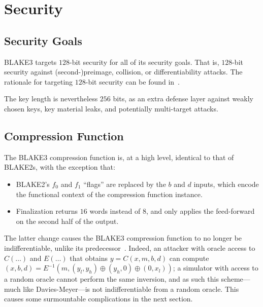 \documentclass[11pt,notitlepage,a4paper]{article}
\begin{document}
\section{Security}\label{sec:security}

\subsection{Security Goals}\label{sec:goals}

BLAKE3 targets $128$-bit security for all of its security goals. That
is, $128$-bit security against (second-)preimage, collision, or
differentiability attacks. 
The rationale for targeting $128$-bit security can be found
in~\cite[\S2]{TMC}.

The key length is nevertheless $256$ bits, as an extra defense layer
against weakly chosen keys, key material leaks, and potentially
multi-target attacks.


\subsection{Compression Function}\label{sec:compressindiff}

The BLAKE3 compression function is, at a high level, identical to that of BLAKE2s, with
the exception that:

\begin{itemize}
  \item BLAKE2's $f_0$ and $f_1$ ``flags'' are replaced by the $b$ and $d$ inputs, which
  encode the functional context of the compression function instance.
  \item Finalization returns $16$ words instead of $8$, and only applies the feed-forward on the second half of the output.
\end{itemize}

The latter change causes the BLAKE3 compression function to no longer be indifferentiable, unlike its predecessor~\cite{DBLP:journals/tosc/LuykxMN16}. Indeed, an attacker with oracle access to $C(\dots)$ and $E(\dots)$ that obtains $y = C(x, m, b, d)$ can compute $(x, b, d) = E^{-1}(m, (y_l, y_h) \oplus (y_h, 0) \oplus (0, x_l))$; a simulator with access to a random oracle cannot perform the same inversion, and as such this scheme---much like Davies-Meyer---is not indifferentiable from a random oracle. This causes some surmountable complications in the next section.
\end{document}
